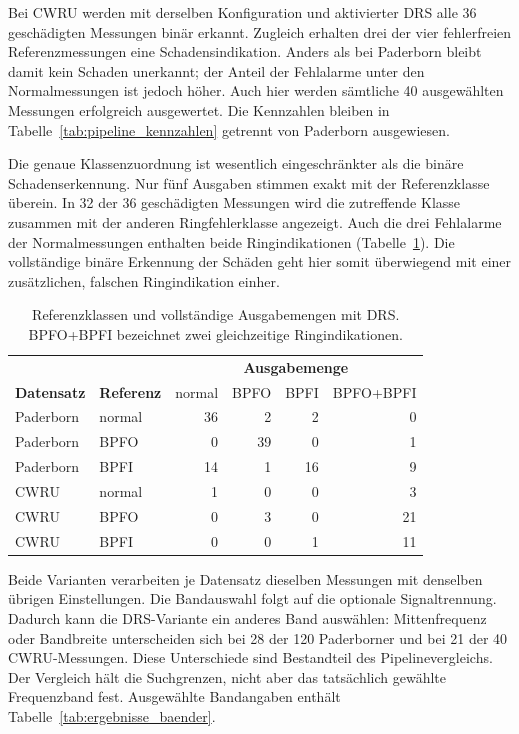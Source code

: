 Bei CWRU werden mit derselben Konfiguration und aktivierter DRS alle
36 geschädigten Messungen binär erkannt. Zugleich erhalten drei der vier
fehlerfreien Referenzmessungen eine Schadensindikation. Anders als bei
Paderborn bleibt damit kein Schaden unerkannt; der Anteil der Fehlalarme
unter den Normalmessungen ist jedoch höher. Auch hier werden sämtliche
40 ausgewählten Messungen erfolgreich ausgewertet. Die Kennzahlen bleiben
in Tabelle~\ref{tab:pipeline_kennzahlen} getrennt von Paderborn ausgewiesen.

Die genaue Klassenzuordnung ist wesentlich eingeschränkter als die binäre
Schadenserkennung. Nur fünf Ausgaben stimmen exakt mit der Referenzklasse
überein. In 32 der 36 geschädigten Messungen wird die zutreffende Klasse
zusammen mit der anderen Ringfehlerklasse angezeigt. Auch die drei
Fehlalarme der Normalmessungen enthalten beide Ringindikationen
(Tabelle~\ref{tab:cwru_ausgabemengen}). Die vollständige binäre Erkennung
der Schäden geht hier somit überwiegend mit einer zusätzlichen, falschen
Ringindikation einher.

\begin{table}[htbp]
  \centering
  \caption{Referenzklassen und vollständige Ausgabemengen mit DRS.
    BPFO+BPFI bezeichnet zwei gleichzeitige Ringindikationen.}
  \label{tab:cwru_ausgabemengen}
  \small
  \begin{tabular}{llrrrr}
    \hline
    & & \multicolumn{4}{c}{\textbf{Ausgabemenge}} \\
    \textbf{Datensatz} & \textbf{Referenz} & normal & BPFO & BPFI & BPFO+BPFI \\
    \hline
    Paderborn & normal & 36 & 2 & 2 & 0 \\
    Paderborn & BPFO & 0 & 39 & 0 & 1 \\
    Paderborn & BPFI & 14 & 1 & 16 & 9 \\
    \hline
    CWRU & normal & 1 & 0 & 0 & 3 \\
    CWRU & BPFO & 0 & 3 & 0 & 21 \\
    CWRU & BPFI & 0 & 0 & 1 & 11 \\
    \hline
  \end{tabular}
\end{table}


Beide Varianten verarbeiten je Datensatz dieselben Messungen mit denselben
übrigen Einstellungen. Die Bandauswahl folgt auf die optionale
Signaltrennung. Dadurch kann die DRS-Variante ein anderes Band
auswählen: Mittenfrequenz oder Bandbreite unterscheiden sich bei 28 der
120 Paderborner und bei 21 der 40 CWRU-Messungen. Diese Unterschiede sind
Bestandteil des Pipelinevergleichs. Der Vergleich hält die Suchgrenzen,
nicht aber das tatsächlich gewählte Frequenzband fest.
Ausgewählte Bandangaben enthält Tabelle~\ref{tab:ergebnisse_baender}.

